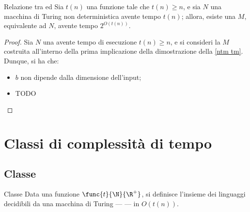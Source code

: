 \documentclass[a4paper, 12pt]{report}
\begin{document}
    \begin{framedthm}[label={ntm time}]{Relazione tra \TM ed \NTM}
        Sia $t(n)$ una funzione tale che $t(n) \ge n$, e sia $N$ una macchina di Turing non deterministica avente tempo $t(n)$; allora, esiste una \TM $M$, equivalente ad $N$, avente tempo $2^{O(t(n))}$.
    \end{framedthm}

    \begin{proof}
        Sia $N$ una \NTM avente tempo di esecuzione $t(n) \ge n$, e si consideri la \TM $M$ costruita all'interno della prima implicazione della dimostrazione della \cref{ntm tm}. Dunque, si ha che:

        \begin{itemize}
            \item $b$ non dipende dalla dimensione dell'input;
            \item TODO
        \end{itemize}
    \end{proof}

    \section{Classi di complessità di tempo}

    \subsection{Classe \DTIME}

    \begin{frameddefn}{Classe \DTIME}
        Data una funzione $\func{t}{\N}{\R^+}$, si definisce  l'insieme dei linguaggi decidibili da una macchina di Turing ---  --- in $O(t(n))$.
    \end{frameddefn}
\end{document}

